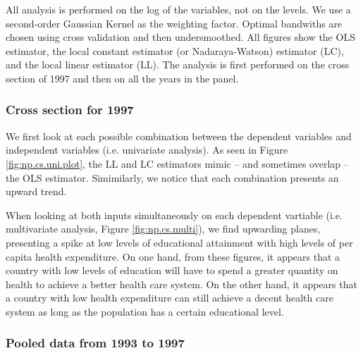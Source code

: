\documentclass[12pt,a4paper]{article}\usepackage[]{graphicx}\usepackage[]{color}
\begin{document}
 
All analysis is performed on the log of the variables, not on the levels. We use a second-order Gaussian Kernel as the weighting factor. Optimal bandwiths are chosen using cross validation and then undersmoothed. All figures show the OLS estimator, the local constant estimator (or Nadaraya-Watson) estimator (LC), and the local linear estimator (LL). The analysis is first performed on the cross section of 1997 and then on all the years in the panel.




 
\subsubsection{Cross section for 1997}
 
We first look at each possible combination between the dependent variables and independent variables (i.e. univariate analysis). As seen in Figure \ref{fig:np.cs.uni.plot}, the LL and LC estimators mimic -- and sometimes overlap -- the OLS estimator. Simimilarly, we notice that each combination presents an upward trend.
 
When looking at both inputs simultaneously on each dependent vartiable (i.e. multivariate analysis, Figure \ref{fig:np.cs.multi}), we find upwarding planes, presenting a spike at low levels of educational attainment with high levels of per capita health expenditure. On one hand, from these figures, it appears that a country with low levels of education will have to spend a greater quantity on health to achieve a better health care system. On the other hand, it appears that a country with low health expenditure can still achieve a decent health care system as long as the population has a certain educational level.







\subsubsection{Pooled data from 1993 to 1997}
\end{document}
